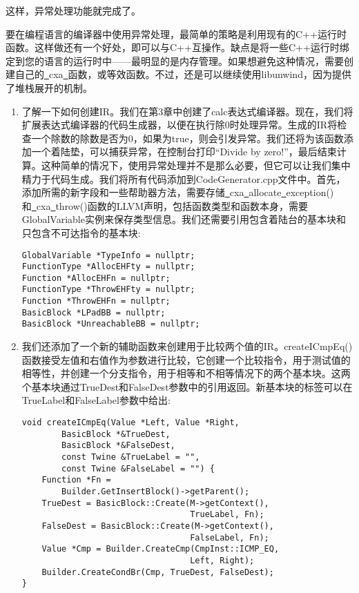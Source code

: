 这样，异常处理功能就完成了。\par

要在编程语言的编译器中使用异常处理，最简单的策略是利用现有的C++运行时函数。这样做还有一个好处，即可以与C++互操作。缺点是将一些C++运行时绑定到您的语言的运行时中——最明显的是内存管理。如果想避免这种情况，需要创建自己的\underline{~}cxa\underline{~}函数，或等效函数。不过，还是可以继续使用libunwind，因为提供了堆栈展开的机制。\par

\begin{enumerate}
\item 了解一下如何创建IR。我们在第3章中创建了calc表达式编译器。现在，我们将扩展表达式编译器的代码生成器，以便在执行除0时处理异常。生成的IR将检查一个除数的除数是否为0，如果为true，则会引发异常。我们还将为该函数添加一个着陆垫，可以捕获异常，在控制台打印“Divide by zero!”，最后结束计算。这种简单的情况下，使用异常处理并不是那么必要，但它可以让我们集中精力于代码生成。我们将所有代码添加到CodeGenerator.cpp文件中。首先，添加所需的新字段和一些帮助器方法，需要存储\underline{~}cxa\underline{~}allocate\underline{~}exception()和\underline{~}cxa\underline{~}throw()函数的LLVM声明，包括函数类型和函数本身，需要GlobalVariable实例来保存类型信息。我们还需要引用包含着陆台的基本块和只包含不可达指令的基本块:
\begin{lstlisting}[caption={}]
GlobalVariable *TypeInfo = nullptr;
FunctionType *AllocEHFty = nullptr;
Function *AllocEHFn = nullptr;
FunctionType *ThrowEHFty = nullptr;
Function *ThrowEHFn = nullptr;
BasicBlock *LPadBB = nullptr;
BasicBlock *UnreachableBB = nullptr;
\end{lstlisting}

\item 我们还添加了一个新的辅助函数来创建用于比较两个值的IR。createICmpEq()函数接受左值和右值作为参数进行比较，它创建一个比较指令，用于测试值的相等性，并创建一个分支指令，用于相等和不相等情况下的两个基本块。这两个基本块通过TrueDest和FalseDest参数中的引用返回。新基本块的标签可以在TrueLabel和FalseLabel参数中给出:
\begin{lstlisting}[caption={}]
void createICmpEq(Value *Left, Value *Right,
		BasicBlock *&TrueDest,
		BasicBlock *&FalseDest,
		const Twine &TrueLabel = "",
		const Twine &FalseLabel = "") {
	Function *Fn =
		Builder.GetInsertBlock()->getParent();
	TrueDest = BasicBlock::Create(M->getContext(),
								  TrueLabel, Fn);
	FalseDest = BasicBlock::Create(M->getContext(),
								  FalseLabel, Fn);
	Value *Cmp = Builder.CreateCmp(CmpInst::ICMP_EQ,
								  Left, Right);
	Builder.CreateCondBr(Cmp, TrueDest, FalseDest);
}
\end{lstlisting}


\end{enumerate}
